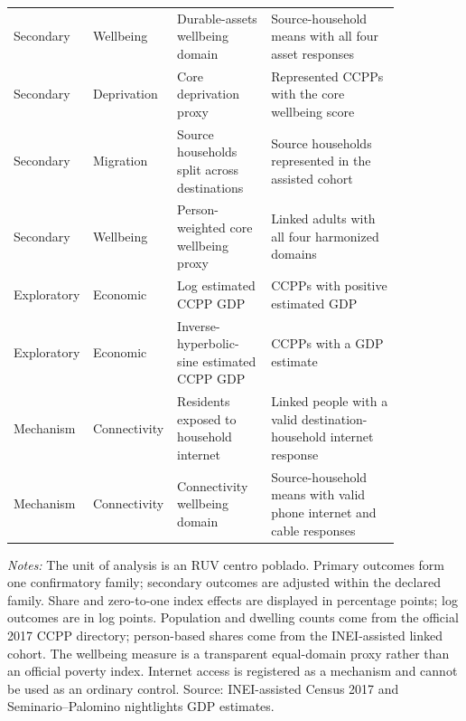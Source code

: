 \begin{longtable}{p{0.10\linewidth}p{0.18\linewidth}p{0.24\linewidth}p{0.33\linewidth}}
Secondary & Wellbeing & Durable-assets wellbeing domain & Source-household means with all four asset responses \\
Secondary & Deprivation & Core deprivation proxy & Represented CCPPs with the core wellbeing score \\
Secondary & Migration & Source households split across destinations & Source households represented in the assisted cohort \\
Secondary & Wellbeing & Person-weighted core wellbeing proxy & Linked adults with all four harmonized domains \\
Exploratory & Economic & Log estimated CCPP GDP & CCPPs with positive estimated GDP \\
Exploratory & Economic & Inverse-hyperbolic-sine estimated CCPP GDP & CCPPs with a GDP estimate \\
Mechanism & Connectivity & Residents exposed to household internet & Linked people with a valid destination-household internet response \\
Mechanism & Connectivity & Connectivity wellbeing domain & Source-household means with valid phone internet and cable responses \\
\bottomrule
\end{longtable}
\begin{minipage}{0.98\linewidth}\footnotesize\textit{Notes:} The unit of analysis is an RUV centro poblado. Primary outcomes form one confirmatory family; secondary outcomes are adjusted within the declared family. Share and zero-to-one index effects are displayed in percentage points; log outcomes are in log points. Population and dwelling counts come from the official 2017 CCPP directory; person-based shares come from the INEI-assisted linked cohort. The wellbeing measure is a transparent equal-domain proxy rather than an official poverty index. Internet access is registered as a mechanism and cannot be used as an ordinary control. Source: INEI-assisted Census 2017 and Seminario--Palomino nightlights GDP estimates.\end{minipage}
\endgroup
